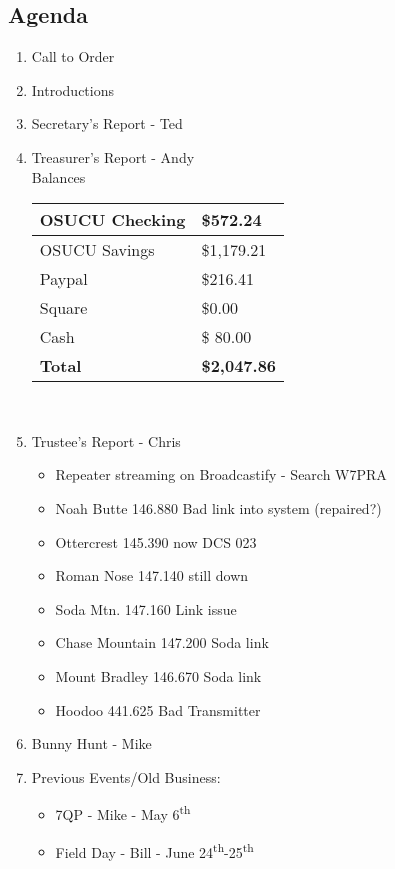 	\subsection*{Agenda}
	\begin{enumerate}
		\item Call to Order
		\item Introductions
		\item Secretary's Report - Ted
		\item Treasurer's Report - Andy \\
				Balances \\
			\begin{tabular}{|l|l|} \hline
				OSUCU Checking & \$572.24 \\ \hline
				OSUCU Savings & \$1,179.21 \\ \hline
				Paypal & \$216.41 \\ \hline
				Square & \$0.00 \\ \hline
				Cash & \$ 80.00 \\ \hline
				\textbf{Total} & \textbf{\$2,047.86} \\ \hline
			\end{tabular} \\
		\item Trustee's Report - Chris
			\begin{itemize}
				\item Repeater streaming on Broadcastify - Search W7PRA
				\item Noah Butte 146.880 Bad link into system (repaired?)
				\item Ottercrest 145.390 now DCS 023
				\item Roman Nose 147.140 still down
				\item Soda Mtn. 147.160 Link issue
				\item Chase Mountain 147.200 Soda link
				\item Mount Bradley 146.670 Soda link
				\item Hoodoo 441.625 Bad Transmitter			
			\end{itemize}
		\item Bunny Hunt - Mike
		\item Previous Events/Old Business:
			\begin{itemize}
				\item 7QP - Mike - May 6\textsuperscript{th}
				\item Field Day - Bill - June 24\textsuperscript{th}-25\textsuperscript{th}
					\begin{itemize}

\end{itemize}
\end{itemize}
\end{enumerate}
